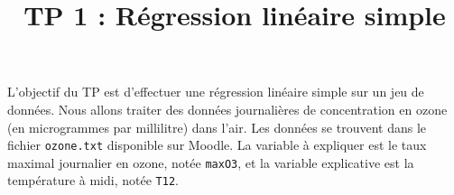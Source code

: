 \documentclass{../../TD/td_um}
\title{TP 1 : Régression linéaire simple}
\providecommand{\1}{\mathds{1}}
\begin{document}
	\maketitle
	
	\bigskip
	\bigskip
	


	\noindent L'objectif du TP est d'effectuer une régression linéaire simple sur un jeu de données. Nous allons traiter des données journalières de concentration en ozone (en microgrammes par millilitre) dans l'air. Les données se trouvent dans le fichier \texttt{ozone.txt} disponible sur Moodle. La variable à expliquer est le taux maximal journalier en ozone, notée \texttt{maxO3}, et la variable explicative est la température à midi, notée \texttt{T12}.\\
	
\end{document}
